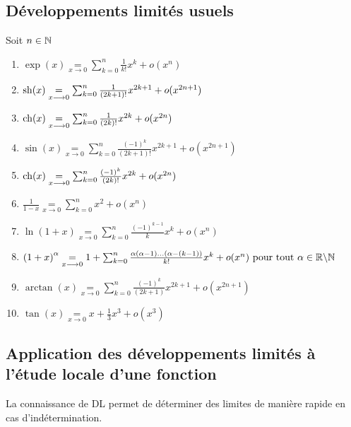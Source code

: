 \subsection{Développements limités usuels}
\begin{defprop}
    Soit \(n \in \mathbb{N}\)
    \begin{enumerate}
        \item \(\exp(x) \underset{x \to 0}{=} \sum_{k=0}^n \frac{1}{k!}x^k + o(x^n)\)
        \item \(\operatorname{sh}(x) \underset{x \longrightarrow 0}{=} \sum_{k=0}^n \frac{1}{(2k+1)!}x^{2k+1} + o(x^{2n+1})\)
        \item \(\operatorname{ch}(x) \underset{x \longrightarrow 0}{=} \sum_{k=0}^n \frac{1}{(2k)!}x^{2k} + o(x^{2n})\)
        \item \(\sin(x) \underset{x \to 0}{=} \sum_{k=0}^n \frac{(-1)^{k}}{(2k+1)!}x^{2k+1} + o(x^{2n+1})\)
        \item \(\operatorname{ch}(x) \underset{x \longrightarrow 0}{=} \sum_{k=0}^n \frac{(-1)^{k}}{(2k)!}x^{2k} + o(x^{2n})\)
        \item \(\frac{1}{1-x} \underset{x \to 0}{=} \sum_{k=0}^n x^{2} + o(x^{n})\)
        \item \(\ln (1+x) \underset{x \to 0}{=} \sum_{k=0}^n \frac{(-1)^{k-1}}{k}x^k + o(x^{n})\)
        \item \(\left(1+x\right)^{\alpha}\underset{x \longrightarrow 0}{=} 1+ \sum_{k=0}^n \frac{\alpha (\alpha-1) \dots (\alpha -(k-1))}{k!} x^k + o(x^n) \text{ pour tout } \alpha \in \mathbb{R} \backslash \mathbb{N}\)
        \item \(\arctan(x) \underset{x \to 0}{=} \sum_{k=0}^n \frac{(-1)^{k}}{(2k+1)}x^{2k+1} + o(x^{2n+1})\)
        \item \(\tan(x) \underset{x \to 0}{=} x + \frac{1}{3}x^3 + o(x^3)\)
    \end{enumerate}
\end{defprop}
\subsection{Application des développements limités à l’étude locale d’une fonction}

\begin{defprop}
    La connaissance de DL permet de déterminer des limites de manière rapide en cas d’indétermination.
\end{defprop}

